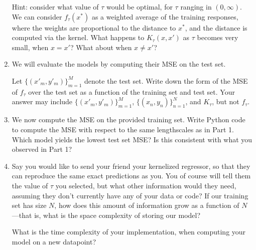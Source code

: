 \documentclass[submit]{harvardml}
\begin{document}
\begin{problem}
\begin{enumerate}
Hint: consider what value of $\tau$ would be optimal, for $\tau$ ranging in $(0, \infty)$. We can consider $f_\tau(x^*)$ as a weighted average of the training responses, where the weights are proportional to the distance to $x^*$, and the distance is computed via the kernel. What happens to $K_\tau(x, x')$ as $\tau$ becomes very small, when $x = x'$? What about when $x \neq x'$?

\item We will evaluate the models by computing their MSE on the test set. 

Let $\{(x'_m, y'_m)\}_{m = 1} ^M$ denote the test set. Write down the form of the MSE of $f_\tau$ over the test set as a function of the training set and test set. Your answer may include $\{(x'_m, y'_m)\}_{m = 1} ^M$, $\{(x_n, y_n)\}_{n = 1} ^N$, and $K_\tau$, but not $f_\tau$.

\item We now compute the MSE on the provided training set. Write Python code to compute the MSE with respect to the same lengthscales as in Part 1. Which model yields the lowest test set MSE? Is this consistent with what you observed in Part 1?

\item 
Say you would like to send your friend your kernelized regressor, so that they can reproduce the same exact predictions as you. You of course will tell them the value of $\tau$ you selected, but what other information would they need, assuming they don't currently have any of your data or code? If our training set has size $N$, how does this amount of information grow as a function of $N$—that is, what is the space complexity of storing our model?

What is the time complexity of your implementation, when computing your model on a new datapoint? 
\end{enumerate}

\end{problem}

\newpage
\end{document}
